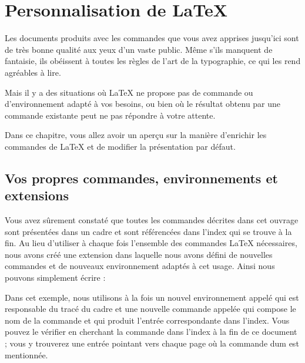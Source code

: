 

\chapter{Personnalisation de \LaTeX}

\begin{intro}
Les documents produits avec les commandes que vous avez apprises
jusqu'ici sont de très bonne qualité aux yeux d'un vaste public. Même s'ils
manquent de fantaisie, ils obéissent à toutes les règles de l'art de
la typographie, ce qui les rend agréables à lire.

Mais il y a des situations où \LaTeX{} ne propose pas de commande ou
d'environnement adapté à vos besoins, ou bien où le résultat obtenu par
une commande existante peut ne pas répondre  à votre attente.

Dans ce chapitre, vous allez avoir un aperçu sur la manière
d'enrichir les commandes de \LaTeX{} et de modifier la présentation
par défaut.
\end{intro}

\section{Vos propres commandes, environnements et extensions}

Vous avez sûrement constaté que toutes les commandes décrites dans cet
ouvrage sont présentées dans un cadre et sont référencées dans l'index
qui se trouve à la fin. Au lieu d'utiliser à chaque fois l'ensemble
des commandes \LaTeX{} nécessaires, nous avons créé une extension dans
laquelle nous avons défini de nouvelles commandes et de nouveaux
environnement adaptés à cet usage. Ainsi nous pouvons simplement
écrire :

\begin{example}
\begin{lscommand}
\end{lscommand}
\end{example}

Dans cet exemple, nous utilisons à la fois un nouvel environnement
appelé  qui est responsable du tracé du cadre et une
nouvelle commande appelée  qui compose le nom de la commande et
qui produit l'entrée correspondante dans l'index. Vous pouvez le
vérifier en cherchant la commande  dans l'index à la fin de ce 
document ; vous
y trouverez une entrée pointant vers chaque page où la commande dum
est mentionnée.

